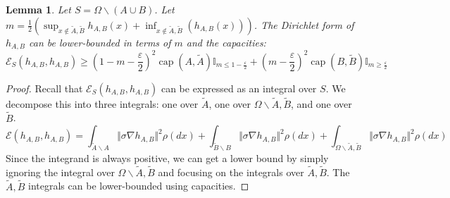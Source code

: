 \documentclass[english, aip, jcp, priprint, graphicx,floatfix]{revtex4-1}
\newcommand{\tmop}[1]{\ensuremath{\operatorname{#1}}}
\newtheorem{lemma}{Lemma}
\theoremstyle{plain}
\theoremstyle{definition}
\theoremstyle{plain}
\newcommand{\indicatorf}[1]{\mathbb{I}_{#1}}
\begin{document}

\begin{lemma}  Let $S=\Omega \backslash (A\cup B)$.  Let $m = \frac{1}{2} (\sup_{x \notin \tilde A,\tilde B} h_{A,B} (x) + \inf_{x \notin \tilde A,\tilde B} (h_{A,B} (x)))$.  The Dirichlet form of $h_{A,B}$ can be lower-bounded in terms of $m$ and the capacities:
\[\mathcal{E}_S (h_{A,B}, h_{A,B}) \geq  
   \left( 1 - m - \frac{\varepsilon}{2} \right)^2 \tmop{cap} (A,\tilde{A}) \indicatorf{m\leq 1-\frac{\varepsilon}{2}} + 
   \left( m- \frac{\varepsilon}{2} \right)^2 \tmop{cap} (B, \tilde{B})\indicatorf{m\geq \frac{\varepsilon}{2}} 
\]
\end{lemma}
\begin{proof}
Recall that $\mathcal{E}_S(h_{A,B}, h_{A,B})$ can be expressed as an integral over $S$.  We decompose this into three integrals: one over $\tilde A$, one over $\Omega \backslash \tilde A,\tilde B$, and one over $\tilde B$.  
\[
\mathcal{E} (h_{A,B}, h_{A,B}) = \int_{\tilde A \backslash A} \Vert \sigma \nabla h_{A,B}\Vert^2 \rho(dx)
                                 + \int_{\tilde B \backslash B} \Vert \sigma \nabla h_{A,B}\Vert^2 \rho(dx)
                                 + \int_{\Omega \backslash \tilde A,\tilde B} \Vert \sigma \nabla h_{A,B}\Vert^2 \rho(dx)
\]
Since the integrand is always positive, we can get a lower bound by simply ignoring the integral over $\Omega \backslash \tilde A,\tilde B$ and focusing on the integrals over $\tilde A,\tilde B$.  The $\tilde A,\tilde B$ integrals can be lower-bounded using capacities.  


\end{proof}
\end{document}
